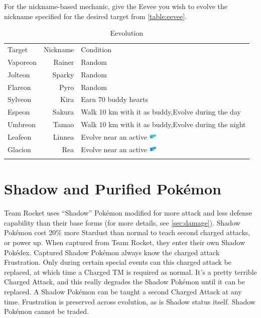 For the nickname-based mechanic, give the Eevee you wish to evolve the nickname
  specified for the desired target from \autoref{table:eevee}.
\begin{table}
  \begin{center}
    \begin{tabular}{lrp{}}
      Target & Nickname & Condition\\
      \Midrule
      Vaporeon & Rainer & Random\\
      Jolteon & Sparky & Random\\
      Flareon & Pyro & Random\\
      Sylveon & Kira & Earn 70 buddy hearts \\
      Espeon & Sakura & Walk 10 km with it as buddy,\newline Evolve during the day\\
      Umbreon & Tamao & Walk 10 km with it as buddy,\newline Evolve during the night\\
      Leafeon & Linnea & Evolve near an active \includegraphics[width=1em,height=1em]{images/rainylure.png} \\
      Glacion & Rea & Evolve near an active \includegraphics[width=1em,height=1em]{images/glaciallure.png} \\\\
    \end{tabular}
  \end{center}
  \caption{Eevolution}
  \label{table:eevee}
\end{table}

\section{Shadow and Purified Pokémon}
\label{sec:shadow}
Team Rocket uses ``Shadow'' Pokémon modified for more attack
 and less defense capability than their base forms (for more details,
 see \autoref{sec:damage}).
Shadow Pokémon cost 20\% more Stardust than normal to teach second charged attacks, or power up.
When captured from Team Rocket, they enter their own Shadow Pokédex.
Captured Shadow Pokémon always know the charged attack Frustration.
Only during certain special events can this charged attack be replaced,
 at which time a Charged TM is required as normal.
It's a pretty terrible Charged Attack, and this really degrades the
 Shadow Pokémon until it can be replaced.
A Shadow Pokémon can be taught a second Charged Attack at any time.
Frustration is preserved across evolution, as is Shadow status itself.
Shadow Pokémon cannot be traded.

